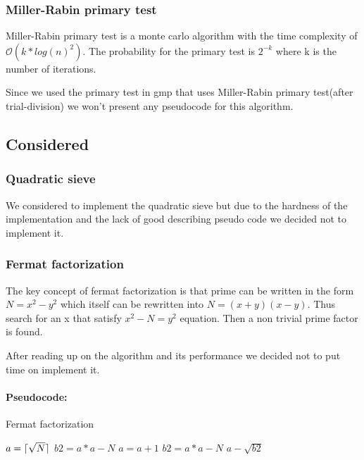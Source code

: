 \subsubsection{Miller-Rabin primary test}

Miller-Rabin primary test is a monte carlo algorithm with the time complexity of $\mathcal{O}(k*log(n)^2)$. The
probability for the primary test is $2^{-k}$ where k is the number of iterations.

Since we used the primary test in gmp that uses Miller-Rabin primary test(after trial-division) we won’t present any pseudocode for this algorithm.

\subsection{Considered}

\subsubsection{Quadratic sieve}

We considered to implement the quadratic sieve but due to the hardness of the implementation and the lack of good describing pseudo code we decided not to implement it.

\subsubsection{Fermat factorization}

The key concept of fermat factorization is that prime can be written in the form $N = x^2 - y^2$ which itself can be rewritten into $N = (x+y)(x-y)$. Thus search for an x that satisfy $x^2 - N = y^2$ equation. Then a non trivial prime factor is found.   

After reading up on the algorithm and its performance we decided not to put time on implement it.

\paragraph{Pseudocode:}

\textcolor{white}{ }

\begin{algorithm}[H]
\caption{Fermat factorization}
\begin{algorithmic}
	\State $a = \lceil\sqrt{N}\rceil$
	\State $b2 = a*a - N$
		\State $a = a + 1$
		\State $b2 = a*a - N$
	\EndWhile	
	\State \Return $a - \sqrt{b2}$
\EndFunction
\end{algorithmic}
\end{algorithm}